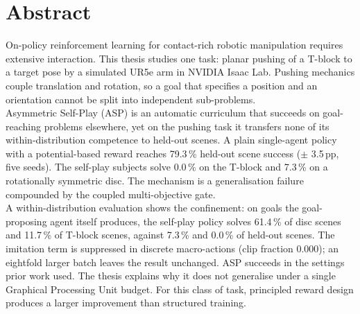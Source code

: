 \thispagestyle{acknowledgements}
\section*{Abstract}

On-policy reinforcement learning for contact-rich robotic manipulation requires
extensive interaction. This thesis studies one task: planar pushing of a
T-block to a target pose by a simulated UR5e arm in NVIDIA Isaac Lab. Pushing
mechanics couple translation and rotation, so a goal that specifies a position
and an orientation cannot be split into independent sub-problems. \\

Asymmetric Self-Play (ASP) is an automatic curriculum that succeeds on
goal-reaching problems elsewhere, yet on the pushing task it transfers none of
its within-distribution competence to held-out scenes. A plain single-agent policy
with a potential-based reward reaches 79.3\,\% held-out scene success
($\pm$ 3.5\,pp, five seeds). The self-play subjects solve 0.0\,\% on the
T-block and 7.3\,\% on a rotationally symmetric disc. The mechanism is a
generalisation failure compounded by the coupled multi-objective gate. \\

A within-distribution evaluation shows the confinement: on goals the
goal-proposing agent itself produces, the self-play policy solves 61.4\,\% of
disc scenes and 11.7\,\% of T-block scenes, against 7.3\,\% and 0.0\,\% of
held-out scenes. The imitation term is suppressed in discrete macro-actions
(clip fraction 0.000); an eightfold larger batch leaves the result unchanged.
ASP succeeds in the settings prior work used. The thesis
explains why it does not generalise under a single Graphical Processing Unit
budget. For this class of task, principled reward design produces a larger
improvement than structured training.
